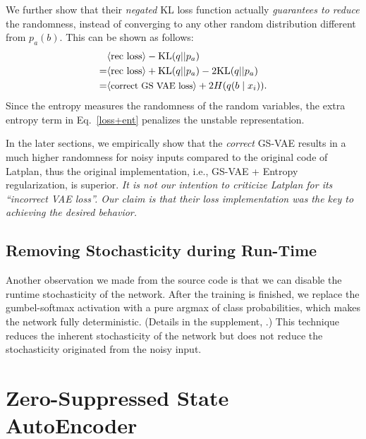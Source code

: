 We further show that their \emph{negated} KL loss function
actually \emph{guarantees to reduce} the randomness,
instead of converging to any other random distribution different from $p_a(b)$.
This can be shown as follows:
\begin{align} 
\nonumber  &\brackets{\text{rec loss}}-{\mathrm{KL}}(q||p_a)                                    \\
\nonumber =&\brackets{\text{rec loss}}+{\mathrm{KL}}(q||p_a) - 2 {\mathrm{KL}}(q||p_a)          \\
\label{loss+ent} =&\brackets{\text{\small correct GS VAE loss}}      + 2 H(q(b \mid x_i)).
\end{align}
Since the entropy measures the randomness of the random variables,
the extra entropy term in Eq.~\eqref{loss+ent} penalizes the unstable representation.

In the later sections, we empirically show that the \emph{correct} GS-VAE results in
a much higher randomness for noisy inputs compared to the original code of Latplan,
thus the original implementation, i.e., GS-VAE + Entropy regularization, is superior.
% 
\emph{It is not our intention to criticize Latplan for its ``incorrect VAE loss''.
Our claim is that their loss implementation was the key to achieving the desired behavior.}

\subsection{Removing Stochasticity during Run-Time}
\label{argmax}

Another observation we made from the source code is that we can
disable the runtime stochasticity of the network.
After the training is finished, we replace the gumbel-softmax activation with
a pure argmax of class probabilities, which makes the network fully deterministic.
(Details in the supplement, .)
This technique reduces the inherent stochasticity of the network
but does not reduce the stochasticity originated from the noisy input.

\section{Zero-Suppressed State AutoEncoder}
\label{zsae}

